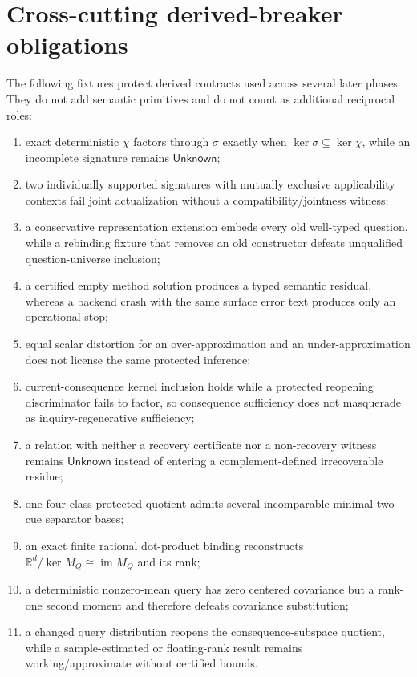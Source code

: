 \documentclass[11pt,oneside]{article}
\begin{document}
\section{Cross-cutting derived-breaker obligations}\label{sec:derived-breakers}

The following fixtures protect derived contracts used across several later phases.
They do not add semantic primitives and do not count as additional reciprocal roles:
\begin{enumerate}
\item exact deterministic \(\chi\) factors through \(\sigma\) exactly when
\(\ker\sigma\subseteq\ker\chi\), while an incomplete signature remains
\(\mathsf{Unknown}\);
\item two individually supported signatures with mutually exclusive applicability
contexts fail joint actualization without a compatibility/jointness witness;
\item a conservative representation extension embeds every old well-typed question,
while a rebinding fixture that removes an old constructor defeats unqualified
question-universe inclusion;
\item a certified empty method solution produces a typed semantic residual, whereas a
backend crash with the same surface error text produces only an operational stop;
\item equal scalar distortion for an over-approximation and an under-approximation
does not license the same protected inference;
\item current-consequence kernel inclusion holds while a protected reopening
discriminator fails to factor, so consequence sufficiency does not masquerade as
inquiry-regenerative sufficiency;
\item a relation with neither a recovery certificate nor a non-recovery witness remains
\(\mathsf{Unknown}\) instead of entering a complement-defined irrecoverable residue;
\item one four-class protected quotient admits several incomparable minimal two-cue
separator bases;
\item an exact finite rational dot-product binding reconstructs
\(\mathbb R^d/\ker M_Q\cong\operatorname{im}M_Q\) and its rank;
\item a deterministic nonzero-mean query has zero centered covariance but a rank-one
second moment and therefore defeats covariance substitution;
\item a changed query distribution reopens the consequence-subspace quotient, while a
sample-estimated or floating-rank result remains working/approximate without certified
bounds.
\end{enumerate}
\end{document}
